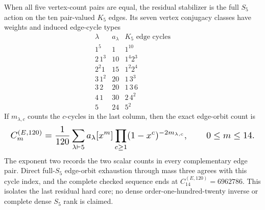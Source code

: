 \documentclass{article}
\newcommand{\fitmath}[1]{\resizebox{0.99\linewidth}{!}{$\displaystyle #1$}}
\begin{document}
When all five vertex-count pairs are equal, the residual stabilizer is the full
$S_5$ action on the ten pair-valued $K_5$ edges. Its seven vertex conjugacy
classes have weights and induced edge-cycle types
\[
\begin{array}{c|c|c}
\lambda & a_\lambda & \text{$K_5$ edge cycles}\\ \hline
1^5 & 1 & 1^{10}\\
2\,1^3 & 10 & 1^4 2^3\\
2^2 1 & 15 & 1^2 2^4\\
3\,1^2 & 20 & 1\,3^3\\
3\,2 & 20 & 1\,3\,6\\
4\,1 & 30 & 2\,4^2\\
5 & 24 & 5^2
\end{array}
\]
If $m_{\lambda,c}$ counts the $c$-cycles in the last column, then the exact
edge-orbit count is
\begin{equation}
  \fitmath{%
    C^{(E,120)}_m=
      \frac1{120}\sum_{\lambda\vdash5}a_\lambda
      [x^m]\prod_{c\geq1}(1-x^c)^{-2m_{\lambda,c}},
    \qquad 0\leq m\leq14.
  }
  \label{eq:optimization-crazy-preimage-cube-quintuple-s5-edge-core}
\end{equation}
The exponent two records the two scalar counts in every complementary edge
pair. Direct full-$S_5$ edge-orbit exhaustion through mass three agrees with
this cycle index, and the complete checked sequence ends at
$C^{(E,120)}_{14}=6962786$. This isolates the last residual hard core; no dense
order-one-hundred-twenty inverse or complete dense $S_5$ rank is claimed.
\end{document}
